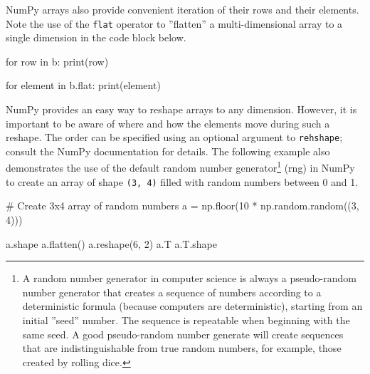 

NumPy arrays also provide convenient iteration of their rows and their elements. Note the use of the \texttt{flat} operator to ''flatten'' a multi-dimensional array to a single dimension in the code block below.

\begin{samepage}
\begin{pythoncode}
for row in b:
    print(row)

for element in b.flat:
    print(element)
\end{pythoncode}
\end{samepage}

NumPy provides an easy way to reshape arrays to any dimension. However, it is important to be aware of where and how the elements move during such a reshape. The order can be specified using an optional argument to \texttt{rehshape}; consult the NumPy documentation for details. The following example also demonstrates the use of the default random number generator\footnote{A random number generator in computer science is always a pseudo-random number generator that creates a sequence of numbers according to a deterministic formula (because computers are deterministic), starting from an initial ''seed'' number. The sequence is repeatable when beginning with the same seed. A good pseudo-random number generate will create sequences that are indistinguishable from true random numbers, for example, those created by rolling dice.} (rng) in NumPy to create an array of shape \texttt{(3, 4)} filled with random numbers between 0 and 1.

\begin{samepage}
\begin{pythoncode}
# Create 3x4 array of random numbers
a = np.floor(10 * np.random.random((3, 4)))

a.shape
a.flatten()
a.reshape(6, 2)
a.T
a.T.shape
\end{pythoncode}
\end{samepage}

